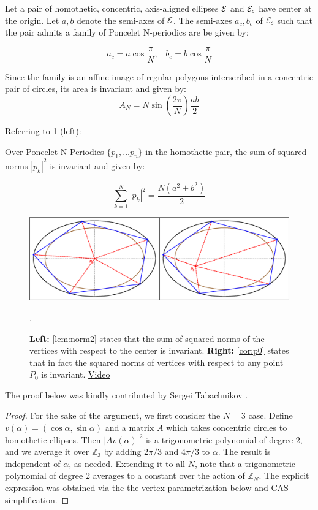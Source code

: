 Let a pair of homothetic, concentric, axis-aligned ellipses $\mathcal{E}$ and $\mathcal{E}_c$ have center at the origin. Let $a,b$ denote the semi-axes of $\mathcal{E}$. The semi-axes $a_c,b_c$ of $\mathcal{E}_c$ such that the pair admits a family of Poncelet N-periodics are be given by:

\[ a_c = a\cos\frac{\pi}{N},\;\;\;b_c = b\cos\frac{\pi}{N} \]

Since the family is an affine image of regular polygons interscribed in a concentric pair of circles, its area is invariant and given by:
\[A_N= N \sin \left( {\frac {2\pi}{N}} \right) \frac{ab}{2}\]

Referring to \cref{fig:homot_norm} (left):

\begin{lemma}
\label{lem:norm2}
Over Poncelet N-Periodics $\{p_1,\ldots p_n\}$ in the homothetic pair, the sum of squared norms $|p_k|^2$  is invariant and given by:

\[   \sum_{k=1}^N |p_k|^2=\frac{ N(a^2 + b^2)}{2}
	\]
\end{lemma}

\begin{figure}
    \centering
    \includegraphics[width=\textwidth]{pics/0020_homot_norm.eps}
    \caption{\textbf{Left:} \cref{lem:norm2} states that the sum of squared norms of the vertices with respect to the center is invariant. \textbf{Right:} \cref{cor:p0} states that in fact the squared norms of vertices with respect to any point $P_0$ is invariant. \href{https://youtu.be/2PdsC3CcqaE}{Video}}.
    \label{fig:homot_norm}
\end{figure}

\noindent The proof below was kindly contributed by Sergei Tabachnikov
\cite{sergei2020-private-sidelengths}.

\begin{proof}
For the sake of the argument, we first consider the $N=3$ case. Define $v(\alpha)=(\cos \alpha, \sin \alpha)$ and a matrix $A$ which takes concentric circles to homothetic ellipses. Then $|Av(\alpha)|^2$ is a trigonometric polynomial of degree 2, and we average it over $\mathbb{Z}_3$ by adding $2\pi/3$ and $4\pi/3$ to $\alpha$. The result is independent of $\alpha$, as needed. Extending it to all $N$, note that a trigonometric polynomial of degree 2 averages to a constant over the action of $\mathbb{Z}_N$. The explicit expression was obtained via the the vertex parametrization below and CAS simplification.


\end{proof}

